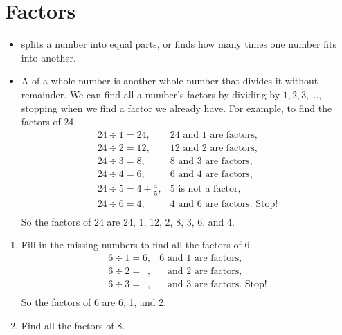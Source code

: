 \documentclass[12pt]{article}
\newcounter{exercisenum}
\newenvironment{exercises}{%
  \begin{tcolorbox}[colback=white,colframe=black,arc=0pt,breakable]
  \begin{enumerate}[label=\arabic*),leftmargin=1cm,resume=exercises]
  \setcounter{enumi}{\value{exercisenum}}
}{%
  \setcounter{exercisenum}{\value{enumi}}
  \end{enumerate}
  \end{tcolorbox}
}
\begin{document}
\thispagestyle{firstpage}

\section{Factors}
\begin{itemize}
\item
{} splits a number into equal parts, or finds how many times one number fits into another.
\item
A  of a whole number is another whole number that divides it without remainder. We can find all a number's factors by dividing by $1, 2, 3,\ldots$, stopping when we find a factor we already have. For example, to find the factors of 24,
$$
\begin{array}{lc}
24 \div 1 = 24, & \text{$24$ and $1$ are factors,} \\
24 \div 2 = 12, & \text{$12$ and $2$ are factors,} \\
24\div 3 = 8, & \text{$8$ and $3$ are factors,} \\
24\div 4 = 6, & \text{$6$ and $4$ are factors,} \\
24\div 5 = 4+\frac{4}{5}, & \text{$5$ is not a factor,} \\
24\div 6 = 4, & \text{$4$ and $6$ are factors. Stop!} \\
\end{array} 
$$
So the factors of 24 are 24, 1, 12, 2, 8, 3, 6, and 4.
\end{itemize}

\begin{exercises}
\item
Fill in the missing numbers to find all the factors of 6.
$$
\begin{array}{lc}
6 \div 1 = 6, & \text{$6$ and $1$ are factors,} \\
6 \div 2 = \boxed{\phantom{3}}, & \text{$\boxed{\phantom{3}}$ and $2$ are factors,} \\
6 \div 3 = \boxed{\phantom{2}}, & \text{$\boxed{\phantom{2}}$ and $3$ are factors. Stop!} \\
\end{array} 
$$
So the factors of 6 are 6, 1, \boxed{\phantom{3}} and 2. \label{Ex:factors_6}
\item
Find all the factors of 8.
\end{exercises}
\end{document}
